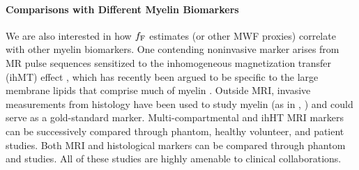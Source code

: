 \paragraph{Comparisons with Different Myelin Biomarkers}
We are also interested
in how $f_{\mathrm{F}}$ estimates (or other MWF proxies)
correlate with other myelin biomarkers. 
One contending noninvasive marker arises
from MR pulse sequences sensitized
to the inhomogeneous magnetization transfer (ihMT) effect
\cite{varma:15:mtf},
which has recently been argued
to be specific
to the large membrane lipids
that comprise much of myelin
\cite{varma:15:iom, swanson:17:mda}.
Outside MRI,
invasive measurements
from histology
have been used to study myelin 
(as in \eg, \cite{gareau:00:mta, webb:03:imt})
and could serve as a gold-standard \insitu marker.
Multi-compartmental and ihHT MRI markers 
can be successively compared 
through phantom, healthy volunteer, and patient studies.
Both MRI and histological markers
can be compared through 
phantom and \insitu studies.
All of these studies
are highly amenable 
to clinical collaborations.
